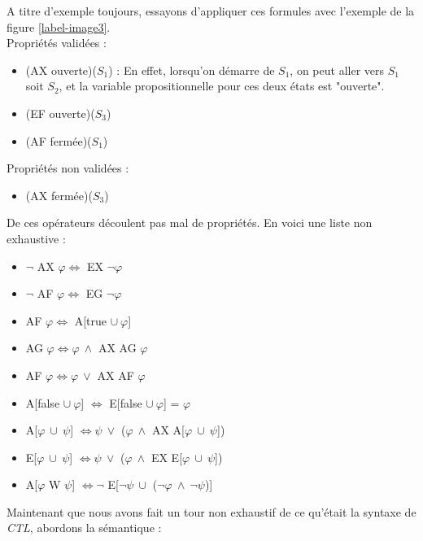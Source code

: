 \documentclass[runningheads,a4paper]{llncs}
\begin{document}
\noindent A titre d'exemple toujours, essayons d'appliquer ces formules avec l'exemple de la figure \ref{label-image3}. \\
Propriétés validées : 
\begin{itemize}
\item (AX ouverte)($S_{1}$) : En effet, lorsqu'on démarre de $S_{1}$, on peut aller vers $S_{1}$ soit $S_{2}$, et la variable propositionnelle pour ces deux états est "ouverte".
\item (EF ouverte)($S_{3}$)
\item (AF fermée)($S_{1}$)\\
\end{itemize}

\noindent Propriétés non validées : 
\begin{itemize}
\item (AX fermée)($S_{3}$)\\
\end{itemize}


\noindent De ces opérateurs découlent pas mal de propriétés. En voici une liste non exhaustive : 
\begin{itemize}
\item $\lnot$ AX $\varphi \Leftrightarrow $ EX $\lnot \varphi$
\item $\lnot$ AF $\varphi \Leftrightarrow $ EG $\lnot \varphi$
\item AF $\varphi \Leftrightarrow $ A[true $\cup \ \varphi$]
\item AG $\varphi \Leftrightarrow \varphi \ \land$ AX AG $\varphi$
\item AF $\varphi \Leftrightarrow \varphi \ \lor$ AX AF $\varphi$
\item A[false $\cup \ \varphi$] $ \Leftrightarrow $ E[false $\cup \ \varphi$] = $\varphi$
\item A[$\varphi \ \cup \ \psi$] $ \Leftrightarrow \psi \ \lor$ ($\varphi \ \land$ AX A[$\varphi \ \cup \ \psi$])
\item E[$\varphi \ \cup \ \psi$] $ \Leftrightarrow \psi \ \lor$ ($\varphi \ \land$ EX E[$\varphi \ \cup \ \psi$])
\item A[$\varphi$ W $\psi$] $ \Leftrightarrow \lnot$ E[$\lnot \psi \ \cup$ ($\lnot \varphi \ \land \ \lnot \psi$)]\\
\end{itemize}

\noindent Maintenant que nous avons fait un tour non exhaustif de ce qu'était la syntaxe de \textit{CTL}, abordons la sémantique :  \\
\end{document}
